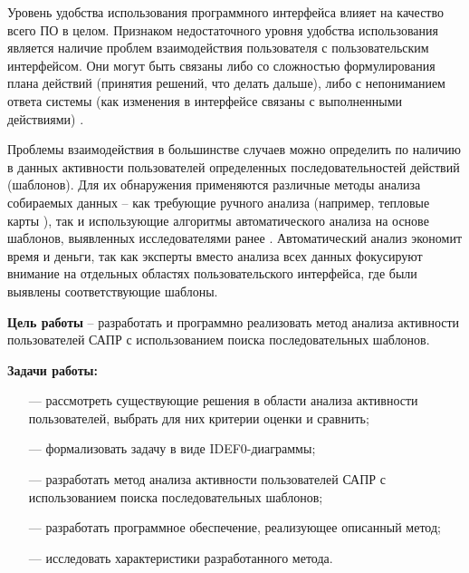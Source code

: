 
Уровень удобства использования программного интерфейса влияет на качество всего ПО в целом. Признаком недостаточного уровня удобства использования является наличие проблем взаимодействия пользователя с пользовательским интерфейсом. Они могут быть связаны либо со сложностью формулирования плана действий (принятия решений, что делать дальше), либо с непониманием ответа системы (как изменения в интерфейсе связаны с выполненными действиями) \cite{1}.

Проблемы взаимодействия в большинстве случаев можно определить по наличию в данных активности пользователей определенных последовательностей действий (шаблонов). Для их обнаружения применяются различные методы анализа собираемых данных – как требующие ручного анализа (например, тепловые карты \cite{2,3}), так и использующие алгоритмы автоматического анализа \cite{1} на основе шаблонов, выявленных исследователями ранее \cite{4, 5, 6}. Автоматический анализ экономит время и деньги, так как эксперты вместо анализа всех данных фокусируют внимание на отдельных областях пользовательского интерфейса,
где были выявлены соответствующие шаблоны.

\textbf{Цель работы} – разработать и программно реализовать метод анализа активности пользователей САПР с использованием поиска последовательных шаблонов.

\textbf{Задачи работы:}
\begin{itemize}
	\item[---] рассмотреть существующие решения в области анализа активности пользователей, выбрать для них критерии оценки и сравнить;
	\item[---] формализовать задачу в виде IDEF0-диаграммы;
	\item[---] разработать метод анализа активности пользователей САПР с использованием поиска последовательных шаблонов; %
	\item[---] разработать программное обеспечение, реализующее описанный метод;
	\item[---] исследовать характеристики разработанного метода.
\end{itemize}
